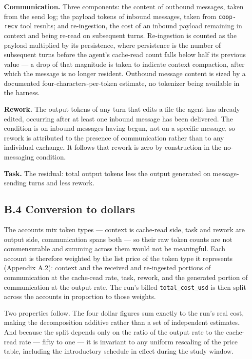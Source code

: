 \documentclass[11pt,a4paper]{article}
\begin{document}
\textbf{Communication.} Three components: the content of outbound messages, taken
from the send log; the payload tokens of inbound messages, taken from
\texttt{coop-recv} tool results; and re-ingestion, the cost of an inbound payload
remaining in context and being re-read on subsequent turns. Re-ingestion is
counted as the payload multiplied by its persistence, where persistence is the
number of subsequent turns before the agent's cache-read count falls below half
its previous value --- a drop of that magnitude is taken to indicate context
compaction, after which the message is no longer resident. Outbound message
content is sized by a documented four-characters-per-token estimate, no tokenizer
being available in the harness.

\textbf{Rework.} The output tokens of any turn that edits a file the agent has
already edited, occurring after at least one inbound message has been delivered.
The condition is on inbound messages having begun, not on a specific message, so
rework is attributed to the presence of communication rather than to any
individual exchange. It follows that rework is zero by construction in the
no-messaging condition.

\textbf{Task.} The residual: total output tokens less the output generated on
message-sending turns and less rework.

\subsection*{B.4 \quad Conversion to dollars}

The accounts mix token types --- context is cache-read side, task and rework are
output side, communication spans both --- so their raw token counts are not
commensurable and summing across them would not be meaningful. Each account is
therefore weighted by the list price of the token type it represents (Appendix
A.2): context and the received and re-ingested portions of communication at the
cache-read rate, task, rework, and the generated portion of communication at the
output rate. The run's billed \texttt{total\_cost\_usd} is then split across the
accounts in proportion to those weights.

Two properties follow. The four dollar figures sum exactly to the run's real cost,
making the decomposition additive rather than a set of independent estimates. And
because the split depends only on the ratio of the output rate to the cache-read
rate --- fifty to one --- it is invariant to any uniform rescaling of the price
table, including the introductory schedule in effect during the study window.
\end{document}
